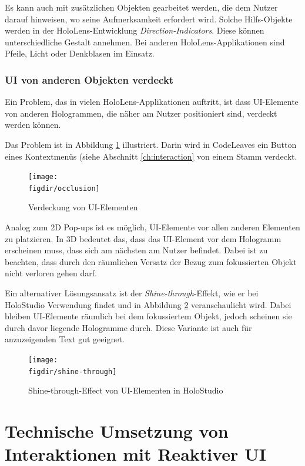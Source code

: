 Es kann auch mit zusätzlichen Objekten gearbeitet werden, die dem Nutzer darauf hinweisen, wo seine Aufmerksamkeit erfordert wird. Solche Hilfs-Objekte werden in der HoloLens-Entwicklung \textit{Direction-Indicators}. Diese können unterschiedliche Gestalt annehmen. Bei anderen HoloLens-Applikationen sind Pfeile, Licht oder Denkblasen im Einsatz.

\subsubsection*{UI von anderen Objekten verdeckt}

Ein Problem, das in vielen HoloLens-Applikationen auftritt, ist dass UI-Elemente von anderen Hologrammen, die näher am Nutzer positioniert sind, verdeckt werden können.

Das Problem ist in Abbildung \ref{fig:occlusion} illustriert. Darin wird in CodeLeaves ein Button eines Kontextmenüs (siehe Abschnitt \ref{ch:interaction} von einem Stamm verdeckt.

\begin{figure}[htb]
  \texttt{[image: \\figdir/occlusion]}
  \caption{Verdeckung von UI-Elementen}
  \label{fig:occlusion}
\end{figure}

Analog zum 2D Pop-ups ist es möglich, UI-Elemente vor allen anderen Elementen zu platzieren. In 3D bedeutet das, dass das UI-Element vor dem Hologramm erscheinen muss, dass sich am nächsten am Nutzer befindet. Dabei ist zu beachten, dass durch den räumlichen Versatz der Bezug zum fokussierten Objekt nicht verloren gehen darf.

Ein alternativer Lösungsansatz ist der \textit{Shine-through}-Effekt, wie er bei HoloStudio Verwendung findet und in Abbildung \ref{fig:shine-through} veranschaulicht wird. Dabei bleiben UI-Elemente räumlich bei dem fokussiertem Objekt, jedoch scheinen sie durch davor liegende Hologramme durch. Diese Variante ist auch für anzuzeigenden Text gut geeignet.

\begin{figure}[htb]
  \texttt{[image: \\figdir/shine-through]}
  \caption{Shine-through-Effect von UI-Elementen in HoloStudio \cite{windows2017casestudy3}}
  \label{fig:shine-through}
\end{figure}

\section{Technische Umsetzung von Interaktionen mit Reaktiver UI}

